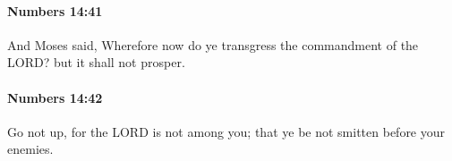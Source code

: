 		\paragraph{Numbers 14:41} %
			\label{NUMBERS-14-41}

			And Moses said, Wherefore now do ye transgress the commandment of the LORD? but it shall not prosper.


		\paragraph{Numbers 14:42} %
			\label{NUMBERS-14-42}

			Go not up, for the LORD is not among you; that ye be not smitten before your enemies.


